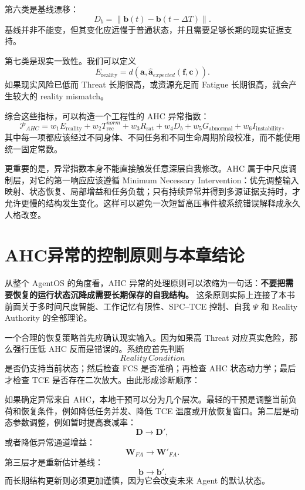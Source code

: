 第六类是基线漂移：
\[
D_b
=
\|\mathbf b(t)-\mathbf b(t-\Delta T)\|.
\]
基线并非不能变，但其变化应远慢于普通状态，并且需要足够长期的现实证据支持。

第七类是现实一致性。我们可以定义
\[
E_{\mathrm{reality}}
=
d
\left(
\mathbf a,
\hat{\mathbf a}_{expected}
(\mathbf f,\mathbf c)
\right).
\]
如果现实风险已低而 Threat 长期很高，或资源充足而 Fatigue 长期很高，就会产生较大的 reality mismatch。

综合这些指标，可以构造一个工程性的 AHC 异常指数：
\[
\mathcal P_{AHC}
=
w_1E_{\mathrm{reality}}
+
w_2T_{\mathrm{rec}}^{norm}
+
w_3R_{\mathrm{sat}}
+
w_4D_b
+
w_5G_{\mathrm{abnormal}}
+
w_6I_{\mathrm{instability}},
\]
其中每一项都应该经过不同身体、不同任务和不同生命周期阶段校准，而不能使用统一固定常数。

更重要的是，异常指数本身不能直接触发任意深层自我修改。AHC 属于中尺度调制层，对它的第一响应应该遵循 Minimum Necessary Intervention：优先调整输入映射、状态恢复、局部增益和任务负载；只有持续异常并得到多源证据支持时，才允许更慢的结构发生变化。这样可以避免一次短暂高压事件被系统错误解释成永久人格改变。

\section{AHC异常的控制原则与本章结论}
\label{sec:ahc_pathology_conclusion}

从整个 AgentOS 的角度看，AHC 异常的处理原则可以浓缩为一句话：\textbf{不要把需要恢复的运行状态沉降成需要长期保存的自我结构。} 这条原则实际上连接了本书前面关于多时间尺度智能、工作记忆有限性、SPC--TCE 控制、自我 $\Psi$ 和 Reality Authority 的全部理论。

一个合理的恢复策略首先应确认现实输入。因为如果高 Threat 对应真实危险，那么强行压低 AHC 反而是错误的。系统应首先判断
\[
Reality\ Condition
\]
是否仍支持当前状态；然后检查 FCS 是否准确；再检查 AHC 状态动力学；最后才检查 TCE 是否存在二次放大。由此形成诊断顺序：
\begin{statementbox}
\centering
{}
\end{statementbox}

如果确定异常来自 AHC，本地干预可以分为几个层次。最轻的干预是调整当前负荷和恢复条件，例如降低任务并发、降低 TCE 温度或开放恢复窗口。第二层是动态参数调整，例如暂时提高衰减率：
\[
\mathbf D
\rightarrow
\mathbf D',
\]
或者降低异常通道增益：
\[
\mathbf W_{FA}
\rightarrow
\mathbf W'_{FA}.
\]
第三层才是重新估计基线：
\[
\mathbf b\rightarrow\mathbf b'.
\]
而长期结构更新则必须更加谨慎，因为它会改变未来 Agent 的默认状态。

